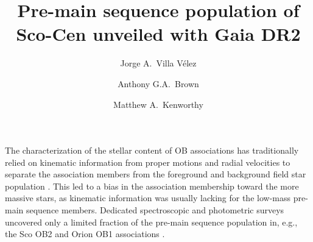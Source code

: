\documentclass[RNAAS]{aastex62}
\begin{document}
\title{Pre-main sequence population of Sco-Cen unveiled with Gaia DR2}


\author[0000-0002-8300-3754]{Jorge A.~Villa V\'{e}lez}

\author[0000-0002-7419-9679]{Anthony G.A.~Brown}

\author[0000-0002-7064-8270]{Matthew A.~Kenworthy}


\section{} 

The characterization of the stellar content of OB associations has traditionally relied on kinematic information from proper motions and radial velocities to separate the association members from the foreground and background field star population \citep{deZeeuw99, Wright18}. This led to a bias in the association membership toward the more massive stars, as kinematic information was usually lacking for the low-mass pre-main sequence members. 
Dedicated spectroscopic and photometric surveys uncovered only a limited fraction of the pre-main sequence population in, e.g., the Sco OB2 and Orion OB1 associations \citep[e.g.][]{Preibisch02, Preibisch08, Briceno18, Kounkel17}. 
\end{document}
